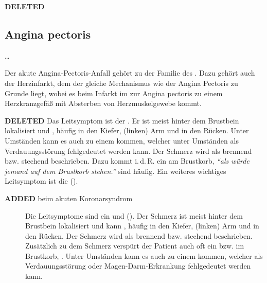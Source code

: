 \documentclass[
ngerman,
paper=a4,
asymmetric,
fontsize=10pt,
headings=small,
draft=false,
numbers=noenddot,
bibtotocnumbered,
footnotes=multiple,
]{scrreprt}
\newcommand{\jALT}{{\color{red}\sffamily\textbf{DELETED}\hrulefill\newline\newline}}
\newcommand{\jALTende}{\newline{\color{red}\rule{\linewidth}{2pt}\newline}}
\newcommand{\jNEU}{{\color{green}\sffamily\textbf{ADDED}\hrulefill\newline\newline}}
\begin{document}
\begin{enumerate}
\jALT
\subsection{Angina pectoris}
\label{topic:angina-pectoris}



\ldots

Der akute Angina-Pectoris-Anfall gehört zu der Familie des
. Dazu gehört auch der
Herzinfarkt, dem der gleiche Mechanismus wie der Angina Pectoris zu
Grunde liegt, wobei es beim Infarkt im  zur Angina
pectoris zu einem  Herzkranzgefäß
mit Absterben von Herzmuskelgewebe kommt.
\jALTende

\jALT
{}
{%
Das Leitsymptom ist der . Er ist meist hinter dem Brustbein
lokalisiert und , häufig in den
Kiefer, (linken) Arm und in den Rücken. Unter Umständen
kann es auch zu einem  kommen,
welcher unter Umständen als Verdauungsstörung fehlgedeutet
werden kann. Der Schmerz wird als brennend bzw. stechend
beschrieben. Dazu kommt i.\,d.\,R. ein  am
Brustkorb, \emph{\enquote{als würde jemand auf dem Brustkorb
stehen.}}  sind
häufig.
Ein weiteres wichtiges Leitsymptom ist die 
().}
{}{}{}{}

\jALTende

\jNEU
\TextSlide
{{\TxSAMPLE} beim akuten Koronarsyndrom}
{
\begin{description}
  \item[] Die Leitsymptome sind ein  und  ().
  Der Schmerz ist meist hinter dem Brustbein lokalisiert und
  kann , häufig in den Kiefer, (linken)
  Arm und in den Rücken. Der Schmerz
  wird als brennend bzw. stechend beschrieben. Zusätzlich zu dem
  Schmerz verspürt der Patient auch oft ein 
  bzw.  im Brustkorb, .
  Unter Umständen kann es auch zu einem  kommen,
  welcher als Verdauungsstörung oder
  Magen-Darm-Erkrankung fehlgedeutet werden kann.
  

\end{description}}
\end{enumerate}
\end{document}

